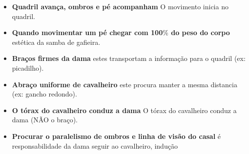 \begin{itemize}
\item \textbf{Quadril avança, ombros e pé acompanham}  O movimento inicia no quadril.
\item \textbf{Quando movimentar um pé chegar com 100$\%$ do peso do corpo} estética da samba de gafieira.
\item \textbf{Braços firmes da dama} estes transportam a informação para o quadril (ex: picadilho).
\item \textbf{Abraço uniforme de cavalheiro} este procura manter a mesma distancia (ex: gancho redondo).
\item \textbf{O tórax do cavalheiro conduz a dama} O tórax do cavalheiro conduz a dama (NÃO o braço).
\item \textbf{Procurar o paralelismo de ombros e linha de visão do casal} é responsabilidade da dama seguir ao cavalheiro, indução

\end{itemize}
